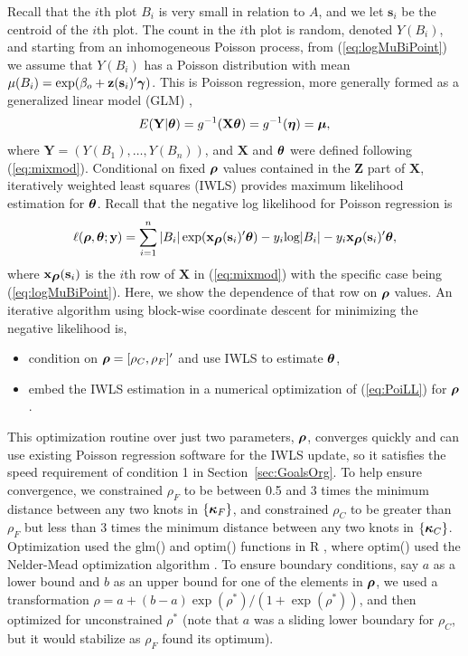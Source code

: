 \documentclass[12pt, titlepage]{article}\usepackage[]{graphicx}\usepackage[]{color}
\newcommand{\bx}{\ensuremath{\mathbf{x}}}
\newcommand{\bz}{\ensuremath{\mathbf{z}}}
\newcommand{\bs}{\ensuremath{\mathbf{s}}}
\def\bs{\mathbf{s}}
\def\by{\mathbf{y}}
\def\bz{\mathbf{z}}
\def\bX{\mathbf{X}}
\def\bY{\mathbf{Y}}
\def\bZ{\mathbf{Z}}
\def\bgamma{\mbox{\boldmath $\gamma$}}
\def\bldeta{\mbox{\boldmath $\eta$}}
\def\bkappa{\mbox{\boldmath $\kappa$}}
\def\bmu{\mbox{\boldmath $\mu$}}
\def\btheta{\mbox{\boldmath $\theta$}}
\def\brho{\mbox{\boldmath $\rho$}}
\def\log{\textrm{log}}
\def\upp{^{\prime}}
\begin{document}
Recall that the $i$th plot $B_i$ is very small in relation to $A$, and we let $\bs_i$ be the centroid of the $i$th plot. The count in the $i$th plot is random, denoted $Y(B_i)$, and starting from an inhomogeneous Poisson process, from (\ref{eq:logMuBiPoint}) we assume that $Y(B_i)$ has a Poisson distribution with mean $\mu(B_i) =  \exp(\beta_o + \bz(\bs_i)^\prime\bgamma)$. This is Poisson regression, more generally formed as a generalized linear model (GLM) \citep{McCu:Neld:gene:1989},
\begin{equation} \label{glm.mean}
	 E(\bY|\btheta) = g^{-1}(\bX\btheta) = g^{-1}(\bldeta) = \bmu,
\end{equation}
%
where $\bY = (Y(B_1),\dots,Y(B_n))$, and $\bX$ and $\btheta$ were defined following (\ref{eq:mixmod}). Conditional on fixed $\brho$ values contained in the $\bZ$ part of $\bX$, iteratively weighted least squares (IWLS) \citep{Neld:Wedd:gene:1972} provides maximum likelihood estimation for $\btheta$.  Recall that the negative log likelihood for Poisson regression is
\begin{equation} \label{eq:PoiLL}
  \ell(\brho,\btheta;\by) = \sum_{i=1}^{n} |B_i|\exp(\bx_{\brho}(\bs_i)\upp\btheta) - y_i\log|B_i| - y_i\bx_{\brho}(\bs_i)\upp\btheta,
\end{equation}
where $\bx_{\brho}(\bs_i)$ is the $i$th row of $\bX$ in (\ref{eq:mixmod}) with the specific case being (\ref{eq:logMuBiPoint}).  Here, we show the dependence of that row on $\brho$ values. An iterative algorithm using block-wise coordinate descent for minimizing the negative likelihood is,
\begin{itemize}
	\item condition on $\brho = [\rho_C,\rho_F]^\prime$ and use IWLS to estimate $\btheta$,
  \item embed the IWLS estimation in a numerical optimization of (\ref{eq:PoiLL}) for $\brho$.
\end{itemize}
This optimization routine over just two parameters, $\brho$, converges quickly and can use existing Poisson regression software for the IWLS update, so it satisfies the speed requirement of condition 1 in Section~\ref{sec:GoalsOrg}.  To help ensure convergence, we constrained $\rho_F$ to be between 0.5 and 3 times the minimum distance between any two knots in $\{\bkappa_F \}$, and constrained $\rho_C$ to be greater than $\rho_F$ but less than 3 times the minimum distance between any two knots in $\{\bkappa_C \}$.  Optimization used the glm() and optim() functions in R \citep{R:Deve:Core:ALan:2014}, where optim() used the Nelder-Mead optimization algorithm \citep{Neld:Mead:simp:1965}.  To ensure boundary conditions, say $a$ as a lower bound and $b$ as an upper bound for one of the elements in $\brho$, we used a transformation $\rho = a + (b-a)\exp(\rho^*)/(1 + \exp(\rho^*))$, and then optimized for unconstrained $\rho^*$ (note that $a$ was a sliding lower boundary for $\rho_C$, but it would stabilize as $\rho_F$ found its optimum).
\end{document}
